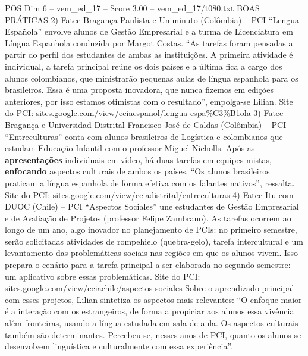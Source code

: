 \begin{textsample}{POS Dim 6 – vem\_ed\_17 – Score 3.00 – vem\_ed\_17/t080.txt}  \label{ex:f6_pos_040}
BOAS PRÁTICAS 2) Fatec Bragança Paulista e Uniminuto (Colômbia) – PCI “Lengua Española” envolve alunos de Gestão Empresarial e a turma de Licenciatura em Língua Espanhola conduzida por Margot Costas. “As tarefas foram pensadas a partir do perfil dos estudantes de ambas as instituições.
A primeira atividade é individual, a tarefa principal reúne os dois países e a última fica a cargo dos alunos colombianos, que ministrarão pequenas aulas de língua espanhola para os brasileiros.
Essa é uma proposta inovadora, que nunca fizemos em edições anteriores, por isso estamos otimistas com o resultado”, empolga-se Lilian.
Site do PCI: sites.google.com/view/eciaespanol/lengua-espa\%C3\%B1ola 3) Fatec Bragança e Universidad Distrital Francisco José de Caldas (Colômbia) – PCI “Entreculturas” conta com alunos brasileiros de Logística e colombianos que estudam Educação Infantil com o professor Miguel Nicholls.
Após as \textbf{apresentações} individuais em vídeo, há duas tarefas em equipes mistas, \textbf{enfocando} aspectos culturais de ambos os países. “Os alunos brasileiros praticam a língua espanhola de forma efetiva com os falantes nativos”, ressalta.
Site do PCI: sites.google.com/view/eciadistrital/entreculturas 4) Fatec Itu com DUOC (Chile) – PCI “Aspectos Sociales” une estudantes de Gestão Empresarial e de Avaliação de Projetos (professor Felipe Zambrano).
As tarefas ocorrem ao longo de um ano, algo inovador no planejamento de PCIs: no primeiro semestre, serão solicitadas atividades de rompehielo (quebra-gelo), tarefa intercultural e um levantamento das problemáticas sociais nas regiões em que os alunos vivem.
Isso prepara o cenário para a tarefa principal a ser elaborada no segundo semestre: um aplicativo sobre essas problemáticas.
Site do PCI: sites.google.com/view/eciachile/aspectos-sociales Sobre o aprendizado principal com esses projetos, Lilian sintetiza os aspectos mais relevantes: “O enfoque maior é a interação com os estrangeiros, de forma a propiciar aos alunos essa vivência além-fronteiras, usando a língua estudada em sala de aula.
Os aspectos culturais também são determinantes.
Percebeu-se, nesses anos de PCI, quanto os alunos se desenvolvem linguística e culturalmente com essa experiência”.

\end{textsample}
